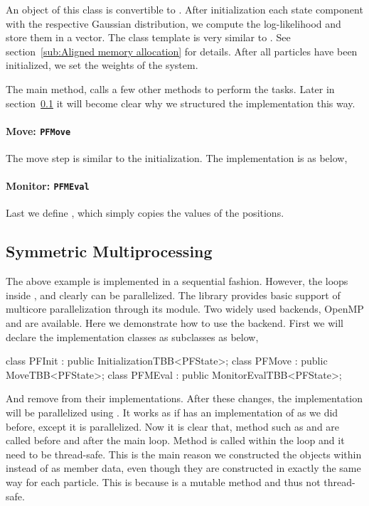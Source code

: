 An object of this class is convertible to
. After initialization each state
component with the respective Gaussian distribution, we compute the
log-likelihood and store them in a vector. The class template
 is very similar to . See
section~\ref{sub:Aligned memory allocation} for details. After all particles
have been initialized, we set the weights of the system.

The main method,  calls a few other methods to perform
the tasks. Later in section~\ref{sub:Symmetric Multiprocessing} it will become
clear why we structured the implementation this way.

\paragraph{Move: \texttt{PFMove}}

The move step is similar to the initialization. The implementation is as below,

\paragraph{Monitor: \texttt{PFMEval}}

Last we define , which simply copies the values of the
positions.

\subsection{Symmetric Multiprocessing}
\label{sub:Symmetric Multiprocessing}

The above example is implemented in a sequential fashion. However, the loops
inside ,  and  clearly
can be parallelized. The library provides basic support of multicore
parallelization through its \smp module. Two widely used backends, OpenMP and
\tbb are available. Here we demonstrate how to use the \tbb backend. First we
will declare the implementation classes as subclasses as below,
\begin{cppcode}
  class PFInit : public InitializationTBB<PFState>;
  class PFMove : public MoveTBB<PFState>;
  class PFMEval : public MonitorEvalTBB<PFState>;
\end{cppcode}
And remove  from their implementations. After these
changes, the implementation will be parallelized using \tbb. It works as if
 has an implementation of
 as we did before, except it is parallelized. Now it is
clear that, method such as  and  are
called before and after the main loop. Method  is called
within the loop and it need to be thread-safe. This is the main reason we
constructed the  objects within
 instead of as member data, even though they are constructed
in exactly the same way for each particle. This is because
 is a mutable method and thus not
thread-safe.

